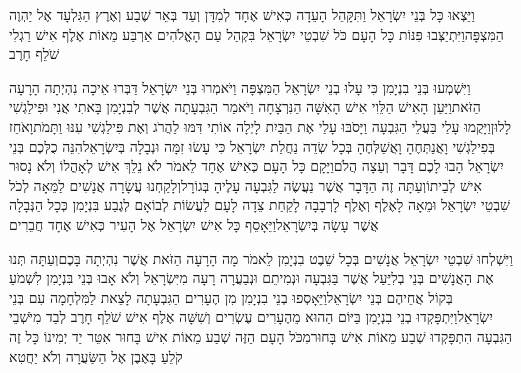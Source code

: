 \documentclass[../main/main.tex]{subfiles}
\begin{document}
\begin{multicols*}{\ncols}
וַיֵּצְאוּ כָּל בְּנֵי יִשְׂרָאֵל וַתִּקָּהֵל הָעֵדָה כְּאִישׁ אֶחָד לְמִדָּן וְעַד בְּאֵר שֶׁבַע וְאֶרֶץ הַגִּלְעָד אֶל יַהְוֶה הַמִּצְפָּה\PreVerseSpace{}וַיִּתְיַצְּבוּ פִּנּוֹת כָּל הָעָם כֹּל שִׁבְטֵי יִשְׂרָאֵל בִּקְהַל עַם הָאֱלֹהִים אַרְבַּע מֵאוֹת אֶלֶף אִישׁ רַגְלִי שֹׁלֵף חָרֶב\OpenSection{}\par
{}וַיִּשְׁמְעוּ בְּנֵי בִנְיָמִן כִּי עָלוּ בְנֵי יִשְׂרָאֵל הַמִּצְפָּה וַיֹּאמְרוּ בְּנֵי יִשְׂרָאֵל דַּבְּרוּ אֵיכָה נִהְיְתָה הָרָעָה הַזֹּאת\PreVerseSpace{}וַיַּעַן הָאִישׁ הַלֵּוִי אִישׁ הָאִשָּׁה הַנִּרְצָחָה וַיֹּאמַר הַגִּבְעָתָה אֲשֶׁר לְבִנְיָמִן בָּאתִי אֲנִי וּפִילַגְשִׁי לָלוּן\PreVerseSpace{}וַיָּקֻמוּ עָלַי בַּעֲלֵי הַגִּבְעָה וַיָּסֹבּוּ עָלַי אֶת הַבַּיִת לָיְלָה אוֹתִי דִּמּוּ לַהֲרֹג וְאֶת פִּילַגְשִׁי עִנּוּ וַתָּמֹת\PreVerseSpace{}וָאֹחֵז בְּפִילַגְשִׁי וָאֲנַתְּחֶהָ וָאֲשַׁלְּחֶהָ בְּכָל שְׂדֵה נַחֲלַת יִשְׂרָאֵל כִּי עָשׂוּ זִמָּה וּנְבָלָה בְּיִשְׂרָאֵל\PreVerseSpace{}הִנֵּה כֻלְּכֶם בְּנֵי יִשְׂרָאֵל הָבוּ לָכֶם דָּבָר וְעֵצָה הֲלֹם\PreVerseSpace{}וַיָּקָם כָּל הָעָם כְּאִישׁ אֶחָד לֵאמֹר לֹא נֵלֵךְ אִישׁ לְאָהֳלוֹ וְלֹא נָסוּר אִישׁ לְבֵיתוֹ\PreVerseSpace{}וְעַתָּה זֶה הַדָּבָר אֲשֶׁר נַעֲשֶׂה לַגִּבְעָה עָלֶיהָ בְּגוֹרָל\PreVerseSpace{}וְלָקַחְנוּ עֲשָׂרָה אֲנָשִׁים לַמֵּאָה לְכֹל שִׁבְטֵי יִשְׂרָאֵל וּמֵאָה לָאֶלֶף וְאֶלֶף לָרְבָבָה לָקַחַת צֵדָה לָעָם לַעֲשׂוֹת לְבוֹאָם לְגֶבַע בִּנְיָמִן כְּכָל הַנְּבָלָה אֲשֶׁר עָשָׂה בְּיִשְׂרָאֵל\PreVerseSpace{}וַיֵּאָסֵף כָּל אִישׁ יִשְׂרָאֵל אֶל הָעִיר כְּאִישׁ אֶחָד חֲבֵרִים\OpenSection{}\par
{}וַיִּשְׁלְחוּ שִׁבְטֵי יִשְׂרָאֵל אֲנָשִׁים בְּכָל שֵׁבֶט\SubEnd{} בִנְיָמִן לֵאמֹר מָה הָרָעָה הַזֹּאת אֲשֶׁר נִהְיְתָה בָּכֶם\PreVerseSpace{}וְעַתָּה תְּנוּ אֶת הָאֲנָשִׁים בְּנֵי בְלִיַּעַל אֲשֶׁר בַּגִּבְעָה וּנְמִיתֵם וּנְבַעֲרָה רָעָה מִיִּשְׂרָאֵל וְלֹא אָבוּ בְּנֵי\OmitEnd{} בִּנְיָמִן לִשְׁמֹעַ בְּקוֹל אֲחֵיהֶם בְּנֵי יִשְׂרָאֵל\PreVerseSpace{}וַיֵּאָסְפוּ בְנֵי בִנְיָמִן מִן הֶעָרִים הַגִּבְעָתָה לָצֵאת לַמִּלְחָמָה עִם בְּנֵי יִשְׂרָאֵל\PreVerseSpace{}וַיִּתְפָּקְדוּ בְנֵי בִנְיָמִן בַּיּוֹם הַהוּא מֵהֶעָרִים עֶשְׂרִים וְשִׁשָּׁה אֶלֶף אִישׁ שֹׁלֵף חָרֶב לְבַד מִיֹּשְׁבֵי הַגִּבְעָה הִתְפָּקְדוּ שְׁבַע מֵאוֹת אִישׁ בָּחוּר\PreVerseSpace{}מִכֹּל הָעָם הַזֶּה שְׁבַע מֵאוֹת אִישׁ בָּחוּר אִטֵּר יַד יְמִינוֹ כָּל זֶה קֹלֵעַ בָּאֶבֶן אֶל הַשַּׂעֲרָה וְלֹא יַחֲטִא\OpenSection{}\par

\end{multicols*}
\end{document}
